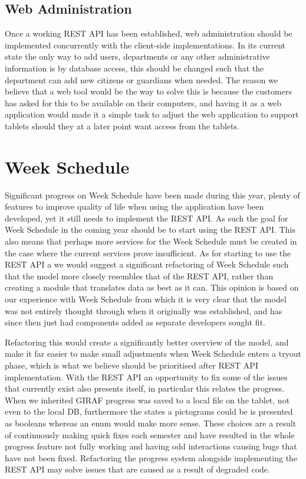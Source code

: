 \subsection{Web Administration}
Once a working REST API has been established, web administration should be implemented concurrently with the client-side implementations.
In its current state the only way to add users, departments or any other administrative information is by database access, this should be changed such that the department can add new citizens or guardians when needed.
The reason we believe that a web tool would be the way to solve this is because the customers has asked for this to be available on their computers, and having it as a web application would made it a simple task to adjust the web application to support tablets should they at a later point want access from the tablets.

\section{Week Schedule}
Significant progress on Week Schedule have been made during this year, plenty of features to improve quality of life when using the application have been developed, yet it still needs to implement the REST API.
As such the goal for Week Schedule in the coming year should be to start using the REST API.
This also means that perhaps more services for the Week Schedule must be created in the case where the current services prove insufficient.
As for starting to use the REST API a we would suggest a significant refactoring of Week Schedule such that the model more closely resembles that of the REST API, rather than creating a module that translates data as best as it can.
This opinion is based on our experience with Week Schedule from which it is very clear that the model was not entirely thought through when it originally was established, and has since then just had components added as separate developers sought fit.

Refactoring this would create a significantly better overview of the model, and make it far easier to make small adjustments when Week Schedule enters a tryout phase, which is what we believe should be prioritised after REST API implementation.
With the REST API an opportunity to fix some of the issues that currently exist also presents itself, in particular this relates the progress.
When we inherited GIRAF progress was saved to a local file on the tablet, not even to the local DB, furthermore the states a pictograms could be is presented as booleans whereas an enum would make more sense.
These choices are a result of continuously making quick fixes each semester and have resulted in the whole progress feature not fully working and having odd interactions causing bugs that have not been fixed.
Refactoring the progress system alongside implementing the REST API may solve issues that are caused as a result of degraded code.

